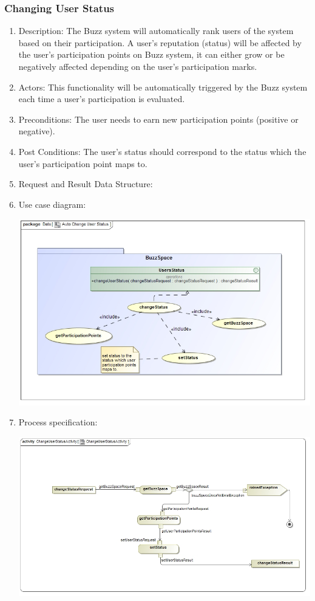\documentclass[hidelinks, 12pt, oneside]{article}
\begin{document}
\subsubsection{Changing User Status}
\begin{enumerate}
\item Description: The Buzz system will automatically rank users of the system based on their participation. A user's  reputation (status) will be affected by the user's participation points on Buzz system, it can either grow or be negatively affected depending on the user's participation marks.   
\item Actors: This functionality will be automatically triggered by the Buzz system each time a user's participation is evaluated.
\item Preconditions: The user needs to earn new participation points (positive or negative).
\item Post Conditions: The user's status should correspond to the status which the user's participation point maps to.
\item Request and Result Data Structure:
\item Use case diagram:\\
\centerline{\includegraphics[scale=0.5]{AutoChangeUserStatus.jpg}}
 \item Process specification:\\
\centerline{\includegraphics[scale=0.5]{ChangeUserStatusActivity.jpg}}

\end{enumerate}
\end{document}
